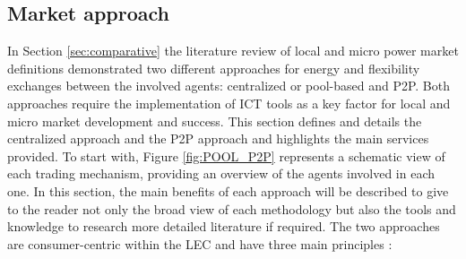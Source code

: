 \begin{table}[htbp]
\centering
\caption{Local market stakeholders and main benefit of their interaction}
\label{tab:23}
\end{table}

\newpage
\subsection{Market approach} \label{sec:marketapproach}

In Section \ref{sec:comparative} the literature review of local and micro power market definitions demonstrated two different
approaches for energy and flexibility exchanges between the involved agents: centralized or pool-based and P2P. Both approaches require the implementation of ICT tools as a key factor for local and micro market development and success. This section defines and details the centralized approach and the P2P approach and highlights the main services provided. To start with, Figure \ref{fig:POOL_P2P} represents a schematic view of each trading mechanism, providing an overview of the agents involved in each one. In this section, the main benefits of each approach will be described to give to the reader not only the broad view of each methodology but also the tools and knowledge to research more detailed literature if required. The two approaches are consumer-centric within the LEC and have three main principles \cite{sousa2018peer}:

